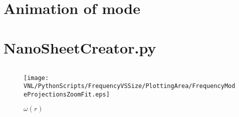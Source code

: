 
\appendix
\appendixpage
\addappheadtotoc
\section{Animation of  mode}
\begin{center}
\end{center}
\section{NanoSheetCreator.py}
\label{NSCstart}
\inputminted[python3=true,bgcolor=Black,linenos=true]{python}{VNL/PythonScripts/NanoSheetCreator.py}
\label{NSCend}
\begin{figure}
  \texttt{[image: VNL/PythonScripts/FrequencyVSSize/PlottingArea/FrequencyModeProjectionsZoomFit.eps]}
  \caption{$\omega(r)$}
  \label{OR}
\end{figure}
\newpage
